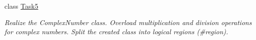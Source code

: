\begin{DoxyCompactItemize}
class \mbox{\hyperlink{class_test_project_1_1_task_library_1_1_tasks_1_1_lesson1_1_1_task5}{Task5}}
\begin{DoxyCompactList}\small\item\em Realize the Complex\+Number class. Overload multiplication and division operations for complex numbers. Split the created class into logical regions (\#region). \end{DoxyCompactList}\end{DoxyCompactItemize}
